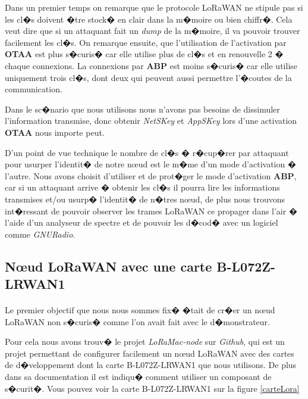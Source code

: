\documentclass[a4paper, titlepage,12pt]{report}
\begin{document}
Dans un premier temps on remarque que le protocole LoRaWAN ne stipule pas si les cl�s doivent �tre stock� en clair dans la m�moire ou bien chiffr�. Cela veut dire que si un attaquant fait un \textit{dump} de la m�moire, il va pouvoir trouver facilement les cl�s.
On remarque ensuite, que l'utilisation de l'activation par \textbf{OTAA} est plus s�curis� car elle utilise plus de cl�s et en renouvelle 2 � chaque connexions. La connexions par \textbf{ABP} est moins s�curis� car elle utilise uniquement trois cl�s, dont deux qui peuvent aussi permettre l'�coutes de la communication.

Dans le sc�nario que nous utilisons nous n'avons pas besoins de dissimuler l'information transmise, donc obtenir \textit{NetSKey} et \textit{AppSKey} lors d'une activation \textbf{OTAA} nous importe peut.

D'un point de vue technique le nombre de cl�s � r�cup�rer par attaquant pour usurper l'identit� de notre n\oe{}ud est le m�me d'un mode d'activation � l'autre.
Nous avons choisit d'utiliser et de prot�ger le mode d'activation \textbf{ABP}, car si un attaquant arrive � obtenir les cl�s il pourra lire les informations transmises et/ou usurp� l'identit� de n�tres n\oe{}ud, de plus nous trouvons int�ressant de pouvoir observer les trames LoRaWAN ce propager dans l'air � l'aide d'un analyseur de spectre et de pouvoir les d�cod� avec un logiciel comme \textit{GNURadio}.

\subsection{N\oe{}ud LoRaWAN avec une carte B-L072Z-LRWAN1}
\paragraph{}
Le premier objectif que nous nous sommes fix� �tait de cr�er un n\oe{}ud LoRaWAN non s�curis� comme l'on avait fait avec le d�monstrateur.

Pour cela nous avons trouv� le projet \textit{LoRaMac-node}\cite{loramacnode}  sur \textit{Github}, qui est un projet permettant de configurer facilement un n\oe{}ud LoRaWAN avec des cartes de d�veloppement dont la carte B-L072Z-LRWAN1 que nous utilisons. De plus dans sa documentation il est indiqu� comment utiliser un composant de s�curit�. Vous pouvez voir la carte B-L072Z-LRWAN1 sur la figure \ref{carteLora}
\end{document}
